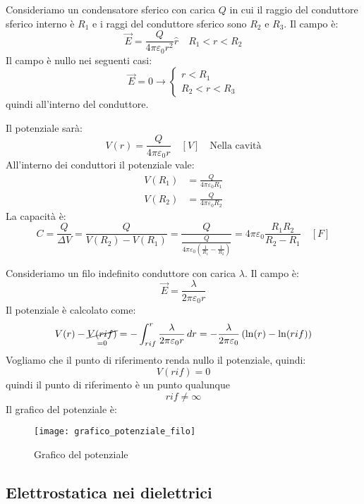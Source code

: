 \documentclass[a4paper]{article}
\begin{document}
\begin{example}
  Consideriamo un condensatore sferico con carica \( Q \) in cui il raggio del conduttore
  sferico interno è \( R_1 \) e i raggi del conduttore sferico sono \( R_2 \) e \( R_3 \).
  Il campo è:
  \[
    \vec{E} = \frac{Q}{4 \pi \varepsilon_0 r^2} \hat{r} \quad R_1 < r < R_2
  \] 
  Il campo è nullo nei seguenti casi:
  \[
    \vec{E} = 0 \to \begin{cases}
      r < R_1\\
      R_2 < r < R_3
    \end{cases}
  \] 
  quindi all'interno del conduttore.

  Il potenziale sarà:
  \[
    V(r) = \frac{Q}{4 \pi \varepsilon_0 r} \quad \left[ V \right] \quad \text{Nella cavità}
  \] 
  All'interno dei conduttori il potenziale vale:
  \[
    \begin{aligned}
      V(R_1) &= \frac{Q}{4 \pi \varepsilon_0 R_1}\\
      V(R_2) &= \frac{Q}{4 \pi \varepsilon_0 R_2}
    \end{aligned}
  \] 
  La capacità è:
  \[
    C = \frac{Q}{\Delta V} = \frac{Q}{V(R_2) - V(R_1)}
    = \frac{Q}{\frac{Q}{4 \pi \varepsilon_0 \left( \frac{1}{R_1} - \frac{1}{R_2} \right)}}
    = 4 \pi \varepsilon_0 \frac{R_1 R_2}{R_2 - R_1} \quad \left[ F \right]
  \] 
\end{example}
\begin{example}
  Consideriamo un filo indefinito conduttore con carica \( \lambda \). Il campo
  è:
  \[
    \vec{E} = \frac{\lambda}{2 \pi \varepsilon_0 r}
  \] 
  Il potenziale è calcolato come:
  \[
    V(r) - \underset{=0}{\cancel{V(rif)}} = - \int_{rif}^r \frac{\lambda}{2 \pi \varepsilon_0 r} \, dr
    = - \frac{\lambda}{2 \pi \varepsilon_0} \left( \ln(r) - \ln(rif) \right) 
  \] 
  Vogliamo che il punto di riferimento renda nullo il potenziale, quindi:
  \[
    V(rif) = 0
  \] 
  quindi il punto di riferimento è un punto qualunque
  \[
    rif \neq \infty
  \] 
  Il grafico del potenziale è:
  \begin{figure}[H]
    \centering
    \texttt{[image: grafico\_potenziale\_filo]}
    \caption{Grafico del potenziale}
  \end{figure}
\end{example}

\subsection{Elettrostatica nei dielettrici}
\end{document}
